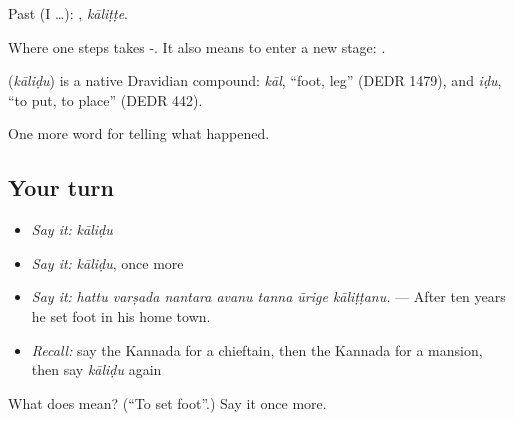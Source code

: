 Past (I …): , \emph{kāliṭṭe}.

Where one steps takes -. It also means to enter a new stage:   .

\begin{cousinweb}
\textbf{} (\emph{kāliḍu}) is a native Dravidian compound: \emph{kāl}, \textquotedblleft{}foot, leg\textquotedblright{} (DEDR 1479), and \emph{iḍu}, \textquotedblleft{}to put, to place\textquotedblright{} (DEDR 442).
\end{cousinweb}

\begin{grammarlens}[title={What you've built}]
One more word for telling what happened.
\end{grammarlens}

\subsection*{Your turn}
\begin{itemize}
\raggedright
  \item \emph{Say it:} \emph{kāliḍu}
  \item \emph{Say it:} \emph{kāliḍu}, once more
  \item \emph{Say it:} \emph{hattu varṣada nantara avanu tanna ūrige kāliṭṭanu.} — After ten years he set foot in his home town.
  \item \emph{Recall:} say the Kannada for a chieftain, then the Kannada for a mansion, then say \emph{kāliḍu} again
\end{itemize}

\begin{tcolorbox}[breakable,colback=teal!4,colframe=teal!35!black,title={Before you move on}]
What does  mean? (\textquotedblleft{}To set foot\textquotedblright{}.) Say it once more.
\end{tcolorbox}
